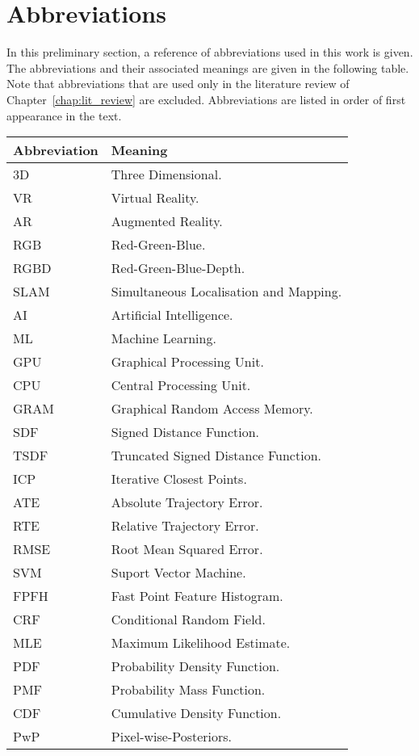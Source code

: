 \section*{Abbreviations}
In this preliminary section, a reference of abbreviations used in this work is given. The 
abbreviations and their associated meanings are given in the following table. Note that 
abbreviations that are used only in the literature review of Chapter~\ref{chap:lit_review} 
are excluded. Abbreviations are listed in order of first appearance in the text.
\begin{longtable}{p{} | p{}}
  \hline
  Abbreviation & Meaning \\
  \hline
  3D & Three Dimensional.\\
  VR & Virtual Reality.\\
  AR & Augmented Reality.\\
  RGB & Red-Green-Blue.\\
  RGBD & Red-Green-Blue-Depth.\\
  SLAM & Simultaneous Localisation and Mapping.\\
  AI & Artificial Intelligence.\\
  ML & Machine Learning.\\
  GPU & Graphical Processing Unit.\\
  CPU & Central Processing Unit.\\
  GRAM & Graphical Random Access Memory.\\
  SDF & Signed Distance Function.\\
  \hline
  TSDF & Truncated Signed Distance Function.\\
  ICP & Iterative Closest Points.\\
  ATE & Absolute Trajectory Error.\\
  RTE & Relative Trajectory Error.\\
  RMSE & Root Mean Squared Error.\\
  SVM & Suport Vector Machine.\\
  FPFH & Fast Point Feature Histogram.\\
  \hline
  CRF & Conditional Random Field.\\
  MLE & Maximum Likelihood Estimate.\\
  PDF & Probability Density Function.\\
  PMF & Probability Mass Function.\\
  CDF & Cumulative Density Function.\\
  PwP & Pixel-wise-Posteriors.\\

\end{longtable}
